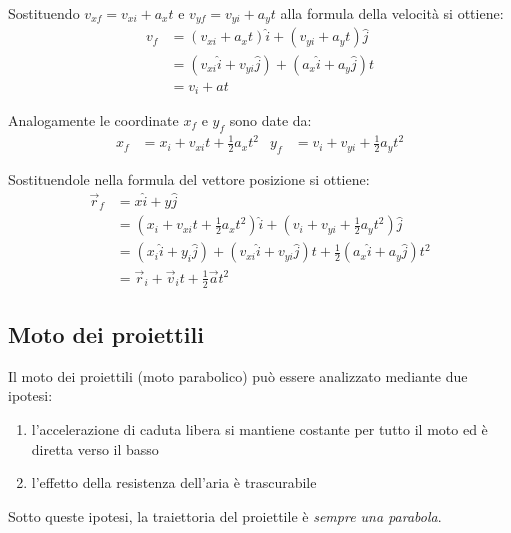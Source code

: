 \documentclass[12pt,oneside]{book}
\begin{document}
\noindent Sostituendo $v_{xf} = v_{xi} + a_x t$ e $v_{yf} = v_{yi} + a_y t$ alla formula della velocità si ottiene:
\begin{align*}
    v_f & = (v_{xi} + a_x t)\hat{i} + (v_{yi} + a_y t)\hat{j}            \\
        & = (v_{xi}\hat{i} + v_{yi}\hat{j}) + (a_x\hat{i} + a_y\hat{j})t \\
        & = v_i + at
\end{align*}

\noindent Analogamente le coordinate $x_f$ e $y_f$ sono date da:
\begin{align*}
    x_f & = x_i + v_{xi}t + \frac{1}{2}a_xt^2 & y_f & = v_i + v_{yi} + \frac{1}{2}a_yt^2
\end{align*}

\noindent Sostituendole nella formula del vettore posizione si ottiene:
\begin{align*}
    \vec{r}_f & = x\hat{i} + y\hat{j}                                                                                            \\
              & = (x_i + v_{xi}t + \frac{1}{2}a_xt^2)\hat{i} + (v_i + v_{yi} + \frac{1}{2}a_yt^2)\hat{j}                         \\
              & = (x_i \hat{i} + y_i \hat{j}) + (v_{xi} \hat{i} + v_{yi} \hat{j})t + \frac{1}{2} (a_x \hat{i} + a_y \hat{j}) t^2 \\
              & = \vec{r}_i + \vec{v}_i t + \frac{1}{2} \vec{a} t^2
\end{align*}

\subsection{Moto dei proiettili}
Il moto dei proiettili (moto parabolico) può essere analizzato mediante due ipotesi:
\begin{enumerate}
    \item l’accelerazione di caduta libera si mantiene costante per tutto il moto ed è diretta verso il basso
    \item l’effetto della resistenza dell’aria è trascurabile
\end{enumerate}
Sotto queste ipotesi, la traiettoria del proiettile è \emph{sempre una parabola}.
\end{document}
